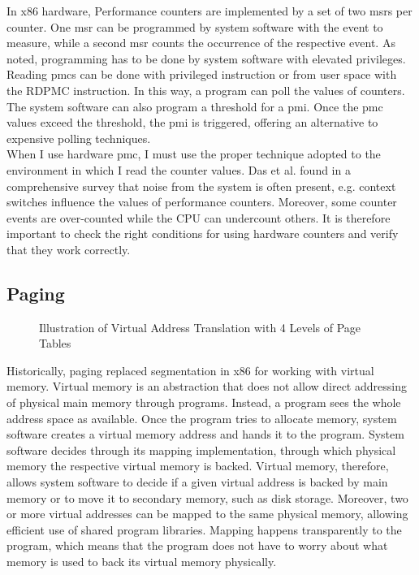 In x86 hardware, Performance counters are implemented by a set of two
\glspl{msr} per counter. One \gls{msr} can be programmed by system software with
the event to measure, while a second \gls{msr} counts the occurrence of the
respective event. As noted, programming has to be done by system software with
elevated privileges. Reading \glspl{pmc} can be done with privileged instruction
or from user space with the RDPMC instruction. In this way, a program can poll
the values of counters. The system software can also program a threshold for a
\gls{pmi}. Once the \gls{pmc} values exceed the threshold, the \gls{pmi} is
triggered, offering an alternative to expensive polling techniques.\\

When I use hardware \gls{pmc}, I must use the proper technique adopted to
the environment in which I read the counter values. Das et al. found in a
comprehensive survey that noise from the system is often present, e.g. context
switches influence the values of performance counters. \cite{das_sok_2019}
Moreover, some counter events are over-counted while the CPU can undercount
others.\cite{weaver_non-determinism_2013} It is therefore important to check the
right conditions for using hardware counters and verify that they work
correctly.

\subsection{Paging}
\label{sec:state:technical:paging}
\begin{center}
    \begin{figure}
        
        \caption{Illustration of Virtual Address Translation with 4 Levels of Page Tables}
        \label{fig:state:technical:paging}
    \end{figure}
\end{center}

Historically, paging replaced segmentation in x86 for working with virtual
memory. Virtual memory is an abstraction that does not allow direct addressing
of physical main memory through programs. Instead, a program sees the whole
address space as available. Once the program tries to allocate memory, system
software creates a virtual memory address and hands it to the program. System
software decides through its mapping implementation, through which physical
memory the respective virtual memory is backed. Virtual memory, therefore,
allows system software to decide if a given virtual address is backed by main
memory or to move it to secondary memory, such as disk storage. Moreover, two or
more virtual addresses can be mapped to the same physical memory, allowing
efficient use of shared program libraries. Mapping happens transparently to the
program, which means that the program does not have to worry about what memory
is used to back its virtual memory physically.\\

